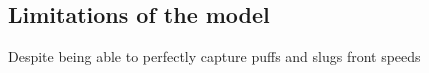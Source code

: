 \documentclass{article}
\begin{document}
\subsection{Limitations of the model}
Despite being able to perfectly capture puffs and slugs front speeds










\end{document}

